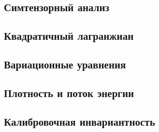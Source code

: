 \documentclass[\docroot/reports/draft/report.tex]{subfiles}
\begin{document}
\onlyinsubfile{\tableofcontents}

\subsection{Симтензорный анализ}


\subsection{Квадратичный лагранжиан}


\subsection{Вариационные уравнения}


\subsection{Плотность и поток энергии}


\subsection{Калибровочная инвариантность}


\end{document}
